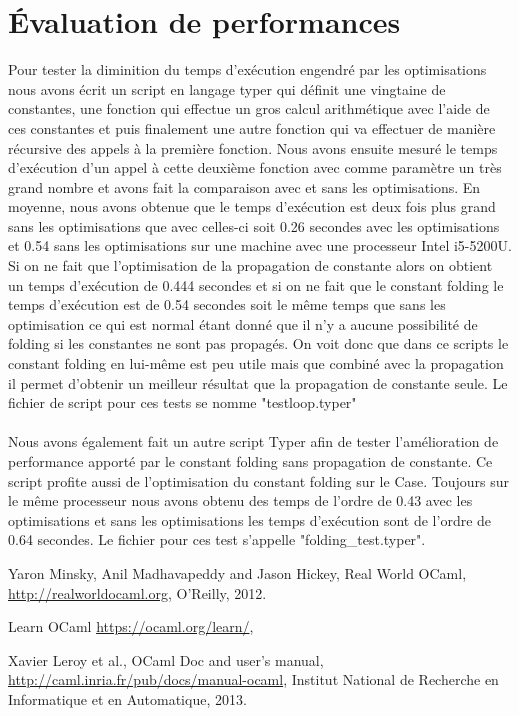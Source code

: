 \documentclass{article}
\begin{document}
\section{Évaluation de performances}

Pour tester la diminition du temps d'exécution engendré par les optimisations
nous avons écrit un script en langage typer qui définit une vingtaine de
constantes, une fonction qui effectue un gros calcul arithmétique avec l'aide
de ces constantes et puis finalement une autre fonction qui va effectuer de
manière récursive des appels à la première fonction. Nous avons ensuite 
mesuré le temps d'exécution d'un appel à cette deuxième fonction avec comme
paramètre un très grand nombre et avons fait la comparaison avec et sans les
optimisations. En moyenne, nous avons obtenue que le temps d'exécution est
deux fois plus
grand sans les optimisations que avec celles-ci soit 0.26 secondes avec les 
optimisations et 0.54 sans les optimisations sur une machine avec une
processeur Intel i5-5200U. Si on ne fait que l'optimisation de la propagation
de constante alors on obtient un temps d'exécution de 0.444 secondes et si
on ne fait que le constant folding le temps d'exécution est de 0.54 secondes 
soit le même temps que sans les optimisation ce qui est normal étant donné que
il n'y a aucune possibilité de folding si les constantes ne sont pas propagés.
On voit donc que dans ce scripts le constant folding en lui-même est peu utile
mais que combiné avec la propagation il permet d'obtenir un meilleur résultat
que la propagation de constante seule. Le fichier de script pour ces tests
se nomme "testloop.typer"

\paragraph{}
Nous avons également fait un autre script Typer afin de tester l'amélioration
de performance apporté par le constant folding sans propagation de constante.
Ce script profite aussi de l'optimisation du constant folding sur le Case.
Toujours sur le même processeur nous avons obtenu des temps de
l'ordre de 0.43 avec les optimisations et sans les optimisations les temps
d'exécution sont de l'ordre de 0.64 secondes. Le fichier pour ces test 
s'appelle "folding\_test.typer".


\begin{thebibliography}{9}

	Yaron Minsky, Anil Madhavapeddy and Jason Hickey,
	Real World OCaml,
	\url{http://realworldocaml.org},
	O'Reilly,
	2012.

	Learn OCaml
	\url{https://ocaml.org/learn/},

	Xavier Leroy et al.,
	OCaml Doc and user's manual,
	\url{http://caml.inria.fr/pub/docs/manual-ocaml},
	Institut National de Recherche en Informatique et en Automatique,
	2013.

\end{thebibliography}
\end{document}
